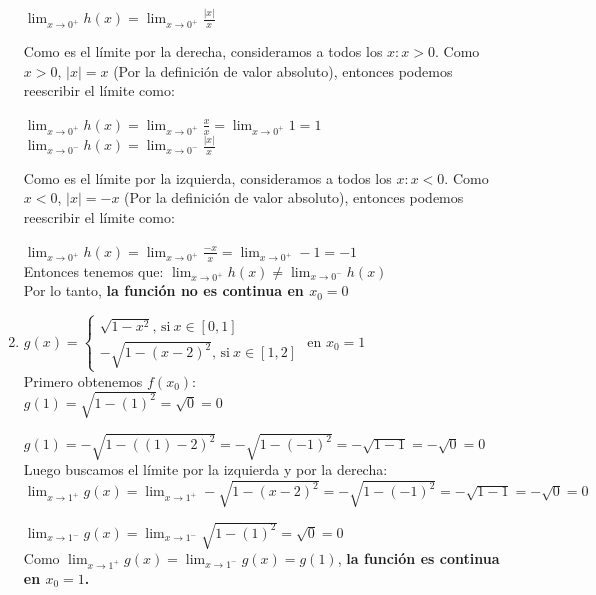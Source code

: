 \documentclass[12pt]{article}
\begin{document}
\begin{enumerate}[\hspace{9px} a)]
        \(\displaystyle\lim_{x \to 0^+}h(x)=\lim_{x \to 0^+}\frac{|x|}{x}\)

        Como es el l\'imite por la derecha, consideramos a todos los $x : x>0$. Como $x>0$, $|x|=x$ (Por la definición de valor absoluto), entonces podemos reescribir el l\'imite como:

        \(\displaystyle\lim_{x \to 0^+}h(x)=\lim_{x \to 0^+}\frac{x}{x}=\lim_{x \to 0^+}1=1\)\\

        \(\displaystyle\lim_{x \to 0^-}h(x)=\lim_{x \to 0^-}\frac{|x|}{x}\)

        Como es el l\'imite por la izquierda, consideramos a todos los $x : x<0$. Como $x<0$, $|x|=-x$ (Por la definición de valor absoluto), entonces podemos reescribir el l\'imite como:

        \(\displaystyle\lim_{x \to 0^+}h(x)=\lim_{x \to 0^+}\frac{-x}{x}=\lim_{x \to 0^+}-1=-1\)\\

        Entonces tenemos que: \quad \(\displaystyle\lim_{x \to 0^+}h(x)\neq\lim_{x \to 0^-}h(x)\)\\

        Por lo tanto, \textbf{la funci\'on no es continua en $x_0=0$}\\

    \item
    \( g(x)=
    \begin{cases}
        \sqrt{1-x^2}\text{, si} \ x \in [0,1]\\
        -\sqrt{1-(x-2)^2}\text{, si} \ x \in [1,2]
    \end{cases}
    \)
    en $x_0=1$\\

        Primero obtenemos $f(x_0)$:\\
        
        \(g(1) = \sqrt{1-(1)^2} =  \sqrt{0} = 0\)
        
        \(g(1) = -\sqrt{1-((1)-2)^2} = -\sqrt{1-(-1)^2} = -\sqrt{1-1} = -\sqrt{0} = 0\)\\

        Luego buscamos el l\'imite por la izquierda y por la derecha:\\

        \(\displaystyle\lim_{x \to 1^+}g(x)=\lim_{x \to 1^+}-\sqrt{1-(x-2)^2} = -\sqrt{1-(-1)^2} = -\sqrt{1-1} = -\sqrt{0} = 0\)

        \( \displaystyle\lim_{x \to 1^-}g(x)=\lim_{x \to 1^-}\sqrt{1-(1)^2} = \sqrt{0} = 0\)\\

        Como \(\displaystyle\lim_{x \to 1^+}g(x)=\lim_{x \to 1^-}g(x)=g(1)\), \textbf{la funci\'on es continua en $x_0=1$.}\\

\end{enumerate}
\end{document}
